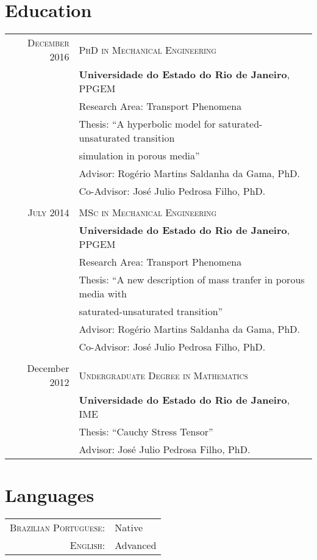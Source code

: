 \documentclass[a4paper,10pt]{article}
\begin{document}
\section{Education}
\begin{tabular}{rl}

\textsc{December} 2016 & \textsc{PhD in Mechanical Engineering}\\&
\textbf{Universidade do Estado do Rio de Janeiro}, \textsc{PPGEM}\\&
Research Area: Transport Phenomena\\&
Thesis: “A hyperbolic model for saturated-unsaturated transition\\& simulation in porous media”\\&
Advisor: Rogério Martins Saldanha da Gama, PhD.\\&
Co-Advisor: José Julio Pedrosa Filho, PhD.\\
\\
\textsc{July 2014} & \textsc{MSc in Mechanical Engineering}\\&
\textbf{Universidade do Estado do Rio de Janeiro}, \textsc{PPGEM}\\&
Research Area: Transport Phenomena\\&
Thesis: “A new description of mass tranfer in porous media with\\&
saturated-unsaturated transition”\\&
Advisor: Rogério Martins Saldanha da Gama, PhD.\\&
Co-Advisor: José Julio Pedrosa Filho, PhD.\\
\\
December 2012 & \textsc{Undergraduate Degree in Mathematics}\\&
\textbf{Universidade do Estado do Rio de Janeiro}, \textsc{IME}\\&
Thesis: “Cauchy Stress Tensor”\\&
Advisor: José Julio Pedrosa Filho, PhD.\\

\end{tabular}

\section{Languages}
\begin{tabular}{rl}
\textsc{Brazilian Portuguese:}&Native\\
\textsc{English:}&Advanced
\end{tabular}


\end{document}
